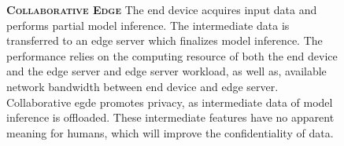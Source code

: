 \begin{figure}
	\begin{minipage}{0.65\linewidth}
		\textbf{\protect{} \textsc{Collaborative Edge}}
		\color{caption-color} \newline
		The end device acquires input data and performs partial model inference. The intermediate data is transferred to an edge server which finalizes model inference. The performance relies on the computing resource of both the end device and the edge server and edge server workload, as well as, available network bandwidth between end device and edge server. Collaborative egde promotes privacy, as intermediate data of model inference is offloaded. These intermediate features have no apparent meaning for humans, which will improve the confidentiality of data.   
	\end{minipage}%
	\hfill
	\begin{minipage}{0.3\linewidth}
		\centering
		\captionsetup[subfigure]{justification=centering}
		\begin{figure}
			\centering

\end{figure}
\end{minipage}
\end{figure}
